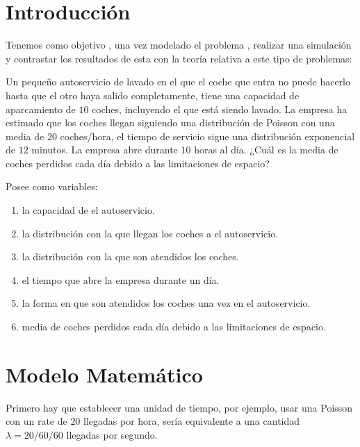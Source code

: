 \documentclass[14pt]{extarticle}
\begin{document}
\section{Introducción}

Tenemos como objetivo , una vez modelado el problema , realizar una simulación y contrastar los resultados de esta con la teoría relativa a este tipo de problemas:

\begin{tcolorbox}[colback=blue!5!white,colframe=blue!75!black, title = Lavadero de Coches]
    
    Un pequeño autoservicio de lavado en el que el coche que entra no puede
    hacerlo hasta que el otro haya salido completamente, tiene una capacidad de
    aparcamiento de $10$ coches, incluyendo el que está siendo lavado. La empresa ha
    estimado que los coches llegan siguiendo una distribución de Poisson con una
    media de $20$ coches/hora, el tiempo de servicio sigue una distribución exponencial
    de $12$ minutos. La empresa abre durante $10$ horas al día. ¿Cuál es la media de
    coches perdidos cada día debido a las limitaciones de espacio?

\end{tcolorbox}

Posee como variables:

\begin{enumerate}
    \item la capacidad de el autoservicio.
    \item la distribución con la que llegan los coches a el autoservicio.
    \item la distribución con la que son atendidos los coches.
    \item el tiempo que abre la empresa durante un día.
    \item la forma en que son atendidos los coches una vez en el autoservicio.
    \item media de coches perdidos cada día debido a las limitaciones de espacio.
\end{enumerate}

\section{Modelo Matemático}

Primero hay que establecer una unidad de tiempo, por ejemplo, usar una Poisson con un rate de $20$ llegadas por hora, sería equivalente a una cantidad $\lambda = 20 / 60 / 60$ llegadas por segundo. 
\end{document}
